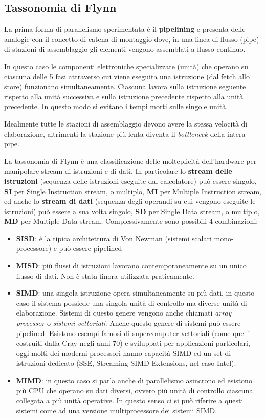 \documentclass[italian,]{article}
\providecommand{\tightlist}{%
  \setlength{\itemsep}{0pt}\setlength{\parskip}{0pt}}
\begin{document}
\subsection{Tassonomia di Flynn}\label{tassonomia-di-flynn}

La prima forma di parallelismo sperimentata è il \textbf{pipelining} e
presenta delle analogie con il concetto di catena di montaggio dove, in
una linea di flusso (pipe) di stazioni di assemblaggio gli elementi
vengono assemblati a flusso continuo.

In questo caso le componenti elettroniche specializzate (unità) che
operano su ciascuna delle 5 fasi attraverso cui viene eseguita una
istruzione (dal fetch allo store) funzionano simultaneamente. Ciascuna
lavora sulla istruzione seguente rispetto alla unità successiva e sulla
istruzione precedente rispetto alla unità precedente. In questo modo si
evitano i tempi morti sulle singole unità.

Idealmente tutte le stazioni di assemblaggio devono avere la stessa
velocità di elaborazione, altrimenti la stazione più lenta diventa il
\emph{bottleneck} della intera pipe.

La tassonomia di Flynn è una classificazione delle molteplicità
dell'hardware per manipolare stream di istruzioni e di dati. In
particolare lo \textbf{stream delle istruzioni} (sequenza delle
istruzioni eseguite dal calcolatore) può essere singolo, \textbf{SI} per
Single Instruction stream, o multiplo, \textbf{MI} per Multiple
Instruction stream, ed anche lo \textbf{stream di dati} (sequenza degli
operandi su cui vengono eseguite le istruzioni) può essere a sua volta
singolo, \textbf{SD} per Single Data stream, o multiplo, \textbf{MD} per
Multiple Data stream. Complessivamente sono possibili 4 combinazioni:

\begin{itemize}
\tightlist
\item
  \textbf{SISD}: è la tipica architettura di Von Newman (sistemi scalari
  mono-processore) e può essere pipelined
\item
  \textbf{MISD}: più flussi di istruzioni lavorano contemporaneamente su
  un unico flusso di dati. Non è stata finora utilizzata praticamente.
\item
  \textbf{SIMD}: una singola istruzione opera simultaneamente su più
  dati, in questo caso il sistema possiede una singola unità di
  controllo ma diverse unità di elaborazione. Sistemi di questo genere
  vengono anche chiamati \emph{array processor} o \emph{sistemi
  vettoriali}. Anche questo genere di sistemi può essere pipelined.
  Esistono esempi famosi di supercomputer vettoriali (come quelli
  costruiti dalla Cray negli anni 70) e sviluppati per applicazioni
  particolari, oggi molti dei moderni processori hanno capacità SIMD ed
  un set di istruzioni dedicato (SSE, Streaming SIMD Extensions, nel
  caso Intel).
\item
  \textbf{MIMD}: in questo caso si parla anche di parallelismo asincrono
  ed esistono più CPU che operano su dati diversi, ovvero più unità di
  controllo ciascuna collegata a più unità operative. In questo senso ci
  si può riferire a questi sistemi come ad una versione multiprocessore
  dei sistemi SIMD.
\end{itemize}
\end{document}
